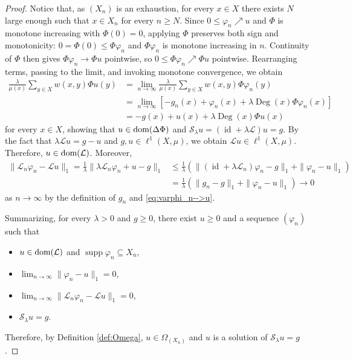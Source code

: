 \documentclass[letterpaper]{article}
\theoremstyle{definition}
\theoremstyle{named}
\numberwithin{equation}{section}
\newcommand{\dom}{\textnormal{dom}} %
\newcommand{\Deg}{\operatorname{Deg}}
\newcommand{\id}{\operatorname{id}}
\newcommand{\Deltaphi}{\mathcal{L}}
\newcommand{\Lmin}{\mathcal{L}_{n}}
\begin{document}
\begin{proof}
Notice that, as $(X_n)$ is an exhaustion, for every $x\in X$ there exists $N$ large enough such that $x\in X_n$ for every $n\geq N$. { Since $0\leq\varphi_n\nearrow u$ and $\Phi$ is monotone increasing with $\Phi(0)=0$, applying $\Phi$ preserves both sign and monotonicity: $0=\Phi(0)\leq\Phi\varphi_n$ and $\Phi\varphi_n$ is monotone increasing in $n$. Continuity of $\Phi$ then gives $\Phi\varphi_n\to\Phi u$ pointwise, so $0\leq\Phi\varphi_n\nearrow \Phi u$ pointwise.} Rearranging terms, passing to the limit, and invoking monotone convergence, we obtain
\[
\begin{split}
\frac{\lambda}{\mu(x)} \sum_{y \in X} w(x,y) \Phi u (y) & = \lim_{n \to \infty} \frac{\lambda}{\mu(x)} \sum_{y \in X} w(x,y) \Phi \varphi_n (y) \\
&= 
\lim_{n \to \infty} [- g_n(x) + \varphi_n(x)+\lambda \Deg(x) \Phi \varphi_n(x)] \\
&= - g(x) + u(x) +\lambda \Deg(x) \Phi u(x)
\end{split}
\]
for every  $x\in X$,
showing that $u \in \dom(\Delta\Phi)$ and
$\mathcal{S}_\lambda u = (\id + \lambda \Deltaphi) u  = g$. By the fact that $\lambda \Deltaphi u = g - u$ and $g, u \in \ell^1(X, \mu)$, we obtain $\Deltaphi u \in \ell^1(X, \mu)$. Therefore, $u\in \dom(\Deltaphi)$. Moreover,
\begin{align*}
\|\Lmin \varphi_n - \Deltaphi u\|_1 = \frac{1}{\lambda} \| \lambda\Lmin \varphi_n + u - g\|_1 
&\leq \frac{1}{\lambda} \left( \|(\operatorname{id} + \lambda \Lmin) \varphi_n - g\|_1 + \| \varphi_n - u\|_1 \right) \nonumber\\
&=\frac{1}{\lambda} \left( \|g_n - g\|_1 + \| \varphi_n - u\|_1 \right)  \to 0
\end{align*}
as $n \to \infty$
by the definition of $g_n$ and \eqref{eq:varphi_n-->u}.

Summarizing, for every $\lambda >0$ and $g\geq 0$, there exist $u \geq 0$ and a sequence $(\varphi_n)$ such that
\begin{itemize}
    \item $u\in \dom(\Deltaphi)$ and $\operatorname{supp}\varphi_n \subseteq X_n$,
    \item $\lim_{n\to\infty} \| \varphi_n - u\|_1 = 0$,
    \item $\lim_{n\to\infty}   \| \Lmin \varphi_n - \Deltaphi u\|_1 = 0$,
    \item $\mathcal{S}_\lambda u = g$.
\end{itemize}
Therefore, by Definition \ref{def:Omega}, $u \in \Omega_{(X_n)}$ 
and $u$ is a solution of $\mathcal{S}_\lambda u = g$.



\end{proof}
\end{document}
